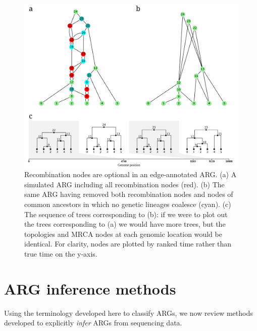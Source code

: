 \documentclass{article}
\begin{document}
\begin{figure}
\centering
\vspace{5em}
\includegraphics[width=\linewidth]{illustrations/ARG_recomb_node_deletion}
\caption{\label{fig-recombination-nodes}
Recombination nodes are optional in an edge-annotated ARG. (a) A simulated
ARG including all recombination nodes (red). (b) The same ARG having removed both
recombination nodes and nodes of common ancestors in which no genetic
lineages coalesce (cyan). (c) The sequence of trees corresponding to (b): if we were
to plot out the trees corresponding to (a) we would have more trees, but the topologies
and MRCA nodes at each genomic location would be identical. For clarity, nodes are
plotted by ranked time rather than true time on the y-axis.
}
\end{figure}



\section*{ARG inference methods}
Using the terminology developed here to classify ARGs, we now review methods developed
to explicitly \emph{infer} ARGs from sequencing data.
\end{document}
